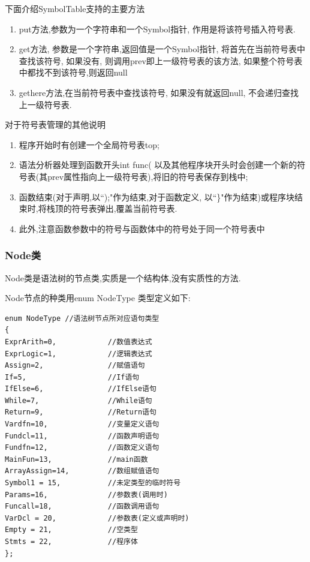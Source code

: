 \documentclass[UTF8]{article}
\begin{document}
下面介绍SymbolTable支持的主要方法
\begin{enumerate}[(1)]
\item put方法,参数为一个字符串和一个Symbol指针, 作用是将该符号插入符号表.
\item get方法, 参数是一个字符串,返回值是一个Symbol指针, 将首先在当前符号表中查找该符号, 如果没有, 则调用prev即上一级符号表的该方法, 如果整个符号表中都找不到该符号,则返回null
\item gethere方法,在当前符号表中查找该符号, 如果没有就返回null, 不会递归查找上一级符号表.
\end{enumerate}
对于符号表管理的其他说明
\begin{enumerate}[(1)]
\item 程序开始时有创建一个全局符号表top; 
\item 语法分析器处理到函数开头int func( 以及其他程序块开头时会创建一个新的符号表(其prev属性指向上一级符号表),将旧的符号表保存到栈中; 
\item 函数结束(对于声明,以``);"作为结束,对于函数定义, 以``\}"作为结束)或程序块结束时,将栈顶的符号表弹出,覆盖当前符号表. 
\item 此外,注意函数参数中的符号与函数体中的符号处于同一个符号表中
\end{enumerate}
\subsubsection{Node类} 
Node类是语法树的节点类,实质是一个结构体,没有实质性的方法.

Node节点的种类用enum NodeType
类型定义如下:
\begin{lstlisting}
enum NodeType //语法树节点所对应语句类型
{
ExprArith=0,            //数值表达式
ExprLogic=1,            //逻辑表达式
Assign=2,               //赋值语句
If=5,                   //If语句
IfElse=6,               //IfElse语句
While=7,                //While语句
Return=9,               //Return语句
Vardfn=10,              //变量定义语句
Fundcl=11,              //函数声明语句
Fundfn=12,              //函数定义语句
MainFun=13,             //main函数
ArrayAssign=14,         //数组赋值语句
Symbol1 = 15,           //未定类型的临时符号
Params=16,              //参数表(调用时)
Funcall=18,             //函数调用语句
VarDcl = 20,            //参数表(定义或声明时)
Empty = 21,             //空类型
Stmts = 22,             //程序体
};
\end{lstlisting}
\end{document}
